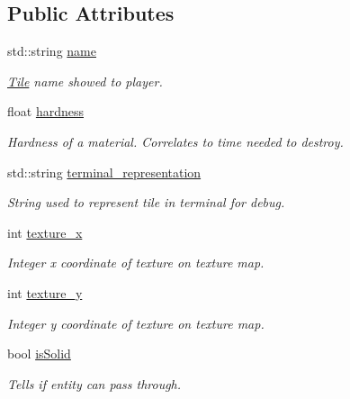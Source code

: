 \subsection*{Public Attributes}
\begin{DoxyCompactItemize}
\item 
\hypertarget{classTile_aa5408d0f0f4a60f25796f651db2f84ac}{std\-::string \hyperlink{classTile_aa5408d0f0f4a60f25796f651db2f84ac}{name}}\label{classTile_aa5408d0f0f4a60f25796f651db2f84ac}

\begin{DoxyCompactList}\small\item\em \hyperlink{classTile}{Tile} name showed to player. \end{DoxyCompactList}\item 
\hypertarget{classTile_accd68364f51cf745c5c95717a164b2e9}{float \hyperlink{classTile_accd68364f51cf745c5c95717a164b2e9}{hardness}}\label{classTile_accd68364f51cf745c5c95717a164b2e9}

\begin{DoxyCompactList}\small\item\em Hardness of a material. Correlates to time needed to destroy. \end{DoxyCompactList}\item 
\hypertarget{classTile_a4792f343c63f2b7c1bf1a7321ba60206}{std\-::string \hyperlink{classTile_a4792f343c63f2b7c1bf1a7321ba60206}{terminal\-\_\-representation}}\label{classTile_a4792f343c63f2b7c1bf1a7321ba60206}

\begin{DoxyCompactList}\small\item\em String used to represent tile in terminal for debug. \end{DoxyCompactList}\item 
\hypertarget{classTile_ac1b8010b027d438ee826af235dc00fe1}{int \hyperlink{classTile_ac1b8010b027d438ee826af235dc00fe1}{texture\-\_\-x}}\label{classTile_ac1b8010b027d438ee826af235dc00fe1}

\begin{DoxyCompactList}\small\item\em Integer x coordinate of texture on texture map. \end{DoxyCompactList}\item 
\hypertarget{classTile_addde9f80a365eae65b1f4bc156f18722}{int \hyperlink{classTile_addde9f80a365eae65b1f4bc156f18722}{texture\-\_\-y}}\label{classTile_addde9f80a365eae65b1f4bc156f18722}

\begin{DoxyCompactList}\small\item\em Integer y coordinate of texture on texture map. \end{DoxyCompactList}\item 
\hypertarget{classTile_a3a32e61b42ec4bc8bb1d924261c19403}{bool \hyperlink{classTile_a3a32e61b42ec4bc8bb1d924261c19403}{is\-Solid}}\label{classTile_a3a32e61b42ec4bc8bb1d924261c19403}

\begin{DoxyCompactList}\small\item\em Tells if entity can pass through. \end{DoxyCompactList}\end{DoxyCompactItemize}


